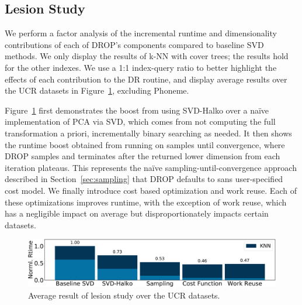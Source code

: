\subsection{Lesion Study}
\label{subsec:lesion}


We perform a factor analysis of the incremental runtime and dimensionality contributions of each of DROP's components compared to baseline SVD methods. 
We only display the results of k-NN with cover trees; the results hold for the other indexes.
We use a 1:1 index-query ratio  to better highlight the effects of each contribution to the DR routine, and display average results over the UCR datasets in Figure~\ref{fig:lesion}, excluding Phoneme.

Figure~\ref{fig:lesion} first demonstrates the boost from using SVD-Halko over a na\"ive implementation of PCA via SVD, which comes from not computing the full transformation a priori, incrementally binary searching as needed. 
It then shows the runtime boost obtained from running on samples until convergence, where DROP samples and terminates after the returned lower dimension from each iteration plateaus.
This represents the na\"ive sampling-until-convergence approach described in Section~\ref{sec:sampling} that DROP defaults to sans user-specified cost model.
We finally introduce cost based optimization and work reuse.
Each of these optimizations improves runtime, with the exception of work reuse, which has a negligible impact on average but disproportionately impacts certain datasets. 


\begin{figure}
\includegraphics[width=\linewidth]{figs/lesion-rev.pdf}
\caption[]{Average result of lesion study over the UCR datasets.}
\label{fig:lesion}
\end{figure}

